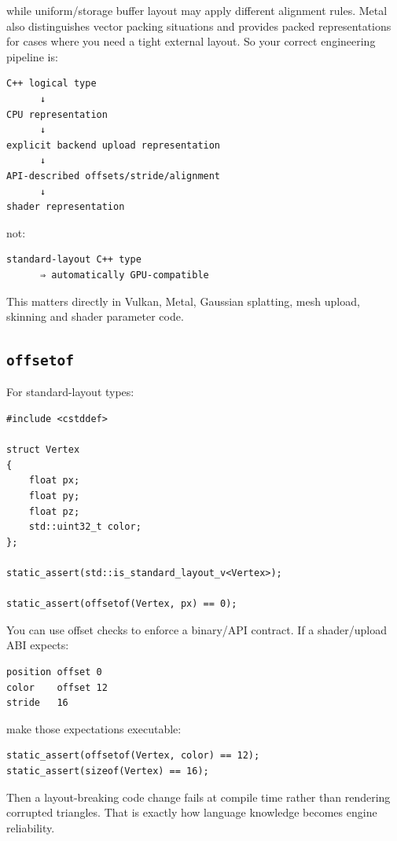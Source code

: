 while uniform/storage buffer layout may apply different alignment rules. Metal also distinguishes vector packing situations and provides packed representations for cases where you need a tight external layout. So your correct engineering pipeline is:

\begin{verbatim}
C++ logical type
      ↓
CPU representation
      ↓
explicit backend upload representation
      ↓
API-described offsets/stride/alignment
      ↓
shader representation
\end{verbatim}

not:

\begin{verbatim}
standard-layout C++ type
      ⇒ automatically GPU-compatible
\end{verbatim}

This matters directly in Vulkan, Metal, Gaussian splatting, mesh upload, skinning and shader parameter code.

\subsection{\texorpdfstring{\texttt{offsetof}}{offsetof}}\label{05-engine-i-ch003-offsetof}

For standard-layout types:

\begin{verbatim}
#include <cstddef>

struct Vertex
{
    float px;
    float py;
    float pz;
    std::uint32_t color;
};

static_assert(std::is_standard_layout_v<Vertex>);

static_assert(offsetof(Vertex, px) == 0);
\end{verbatim}

You can use offset checks to enforce a binary/API contract. If a shader/upload ABI expects:

\begin{verbatim}
position offset 0
color    offset 12
stride   16
\end{verbatim}

make those expectations executable:

\begin{verbatim}
static_assert(offsetof(Vertex, color) == 12);
static_assert(sizeof(Vertex) == 16);
\end{verbatim}

Then a layout-breaking code change fails at compile time rather than rendering corrupted triangles. That is exactly how language knowledge becomes engine reliability.

